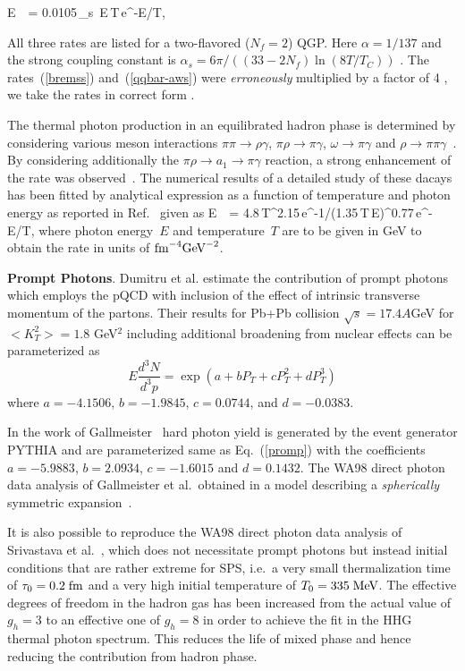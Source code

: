 %
\be
      E\, \, =  
        0.0105\,\alpha \alpha_s
        \,E\,T\,e^{-E/T},
\label{qqbar-aws}
\ee
%

All three rates are listed for a two-flavored
($N_f = 2$) QGP. Here $\alpha=1/137$ and the strong coupling constant is 
$\alpha_s= 6\pi/((33-2N_f) \ln(8T/T_C))$ \cite{KARSCH}.
The rates~(\ref{bremss}) and~(\ref{qqbar-aws}) were 
{\em erroneously} multiplied 
by a factor of 4 \cite{AURENCHE_1998}, 
we take the rates in correct form \cite{THOMA}.

 The thermal photon production in an equilibrated hadron phase
is determined by considering various meson interactions
$\pi \pi \rightarrow \rho \gamma$, $\pi \rho \rightarrow \pi
\gamma$, $\omega \rightarrow \pi \gamma$ and $\rho
\rightarrow \pi \pi \gamma$~\cite{KAPUSTA_1991,NADEAU_1992}.  By considering
additionally the $\pi \rho \rightarrow a_1 \rightarrow \pi \gamma$ reaction, a
strong enhancement of the rate was observed~\cite{XIONG_1992}. 
 The numerical results of a detailed study of these dacays has been
fitted by analytical expression as a function of temperature and photon
energy as reported in Ref.~\cite{THOMA} given as
%
\be
        E\, \, = 
        4.8\,T^{2.15}\,e^{-1/(1.35\,T\,E)^{0.77}}\,e^{-E/T},
\label{Markus_suggestion}
\ee
%
where photon energy~$E$ and temperature~$T$ are to be given in GeV to obtain the
rate in units of $\mbox{fm}^{-4}\mbox{GeV}^{-2}$. 

{\bf Prompt Photons}. 
 Dumitru et al. \cite{DUMI} estimate the contribution of prompt photons 
which employs the pQCD with inclusion of the effect of intrinsic 
transverse momentum of the partons. Their results for Pb+Pb collision
$\sqrt{s} = 17.4 A$GeV for $<K_T^2>=1.8$ GeV$^2$ including additional 
broadening from nuclear effects can be parameterized as 
\begin{equation}\label{promp}
 E \frac{d^3 N}{d^3 p} = \exp(a + bP_T + cP_T^2 + dP_T^3)
\end{equation}
where $a=-4.1506$, $b=-1.9845$, $c=0.0744$, and 
$d=-0.0383$.

 In the work of Gallmeister~\cite{GALLMEISTER_2000} hard photon 
 yield is generated by the event generator PYTHIA and are
parameterized same as Eq.~(\ref{promp}) with the coefficients
$a=-5.9883$, $b=2.0934$, $c=-1.6015$ and $d=0.1432$.
 The WA98 direct photon data analysis of Gallmeister et al.\ obtained in 
a model describing a {\em spherically} symmetric 
expansion~\cite{GALLMEISTER_2000}.

 It is also possible to reproduce the WA98 direct photon data analysis of
Srivastava et al.~\cite{SRIVASTAVA_2000}, which does not necessitate prompt
photons but instead initial conditions that are rather extreme for SPS, i.e.\ a
very small thermalization time of $\tau_0 = 0.2\;\mbox{fm}$ and a very high initial
temperature of $T_0 = 335\;\mbox{MeV}$. 
The effective degrees of freedom in the hadron gas has been increased
from the actual value of $g_h = 3$ to an effective one of $g_h =8$ in order 
to achieve the fit in the HHG thermal photon spectrum. This reduces
the life of mixed phase and hence reducing the contribution from 
hadron phase.


